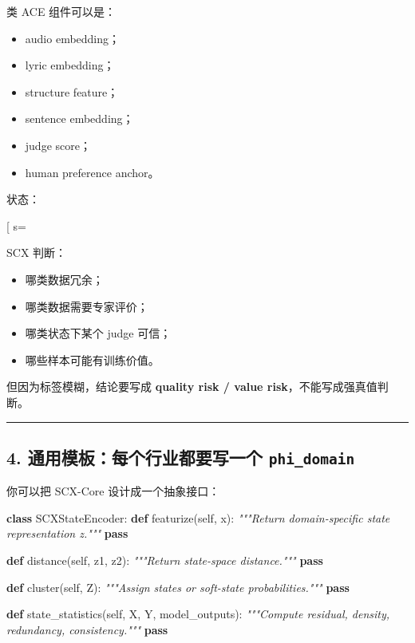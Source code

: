 \documentclass[
  12pt,
]{ctexart}
\newenvironment{Shaded}{}{}
\newcommand{\CommentTok}[1]{\textcolor[rgb]{0.38,0.63,0.69}{\textit{#1}}}
\newcommand{\ControlFlowTok}[1]{\textcolor[rgb]{0.00,0.44,0.13}{\textbf{#1}}}
\newcommand{\KeywordTok}[1]{\textcolor[rgb]{0.00,0.44,0.13}{\textbf{#1}}}
\newcommand{\NormalTok}[1]{#1}
\newcommand{\VariableTok}[1]{\textcolor[rgb]{0.10,0.09,0.49}{#1}}
\providecommand{\tightlist}{%
  \setlength{\itemsep}{0pt}\setlength{\parskip}{0pt}}
\begin{document}
类 ACE 组件可以是：

\begin{itemize}
\tightlist
\item
  audio embedding；
\item
  lyric embedding；
\item
  structure feature；
\item
  sentence embedding；
\item
  judge score；
\item
  human preference anchor。
\end{itemize}

状态：

{[} s=\text{genre / topic / task / audience / style}{]}

SCX 判断：

\begin{itemize}
\tightlist
\item
  哪类数据冗余；
\item
  哪类数据需要专家评价；
\item
  哪类状态下某个 judge 可信；
\item
  哪些样本可能有训练价值。
\end{itemize}

但因为标签模糊，结论要写成 \textbf{quality risk / value
risk}，不能写成强真值判断。

\begin{center}\rule{0.5\linewidth}{0.5pt}\end{center}

\subsection{\texorpdfstring{4. 通用模板：每个行业都要写一个
\texttt{phi\_domain}}{4. 通用模板：每个行业都要写一个 phi\_domain}}\label{ux901aux7528ux6a21ux677fux6bcfux4e2aux884cux4e1aux90fdux8981ux5199ux4e00ux4e2a-phi_domain}

你可以把 SCX-Core 设计成一个抽象接口：

\begin{Shaded}
\begin{Highlighting}[]
\KeywordTok{class}\NormalTok{ SCXStateEncoder:}
    \KeywordTok{def}\NormalTok{ featurize(}\VariableTok{self}\NormalTok{, x):}
        \CommentTok{"""Return domain{-}specific state representation z."""}
        \ControlFlowTok{pass}

    \KeywordTok{def}\NormalTok{ distance(}\VariableTok{self}\NormalTok{, z1, z2):}
        \CommentTok{"""Return state{-}space distance."""}
        \ControlFlowTok{pass}

    \KeywordTok{def}\NormalTok{ cluster(}\VariableTok{self}\NormalTok{, Z):}
        \CommentTok{"""Assign states or soft{-}state probabilities."""}
        \ControlFlowTok{pass}

    \KeywordTok{def}\NormalTok{ state\_statistics(}\VariableTok{self}\NormalTok{, X, Y, model\_outputs):}
        \CommentTok{"""Compute residual, density, redundancy, consistency."""}
        \ControlFlowTok{pass}
\end{Highlighting}
\end{Shaded}
\end{document}

